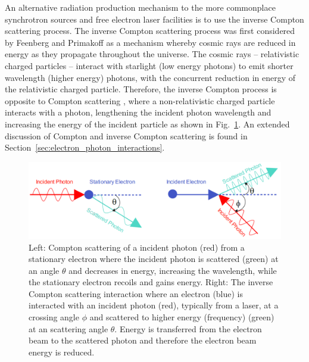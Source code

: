 \documentclass[../main.tex]{subfiles}
\begin{document}
An alternative radiation production mechanism to the more commonplace synchrotron sources and free electron laser facilities is to use the inverse Compton scattering process. The inverse Compton scattering process was first considered by Feenberg and Primakoff \cite{feenberg1948interaction} as a mechanism whereby cosmic rays are reduced in energy as they propagate throughout the universe. The cosmic rays -- relativistic charged particles -- interact with starlight (low energy photons) to emit shorter wavelength (higher energy) photons, with the concurrent reduction in energy of the relativistic charged particle. Therefore, the inverse Compton process is opposite to Compton scattering \cite{compton1923quantum}, where a non-relativistic charged particle interacts with a photon, lengthening the incident photon wavelength and increasing the energy of the incident particle as shown in Fig.~\ref{fig:intro_CS_ICS}. An extended discussion of Compton and inverse Compton scattering is found in Section~\ref{sec:electron_photon_interactions}. 
\begin{figure}[!h]
\centering
\includegraphics[width=\textwidth]{Figures/Introduction/CS_ICS_diagram_simple_fixed.pdf}
\caption{Left: Compton scattering of a incident photon (red) from a stationary electron where the incident photon is scattered (green) at an angle $\theta$ and decreases in energy, increasing the wavelength, while the stationary electron recoils and gains energy. Right: The inverse Compton scattering interaction where an electron (blue) is interacted with an incident photon (red), typically from a laser, at a crossing angle $\phi$ and scattered to higher energy (frequency) (green) at an scattering angle $\theta$. Energy is transferred from the electron beam to the scattered photon and therefore the electron beam energy is reduced.}
\label{fig:intro_CS_ICS}
\end{figure}
\end{document}
